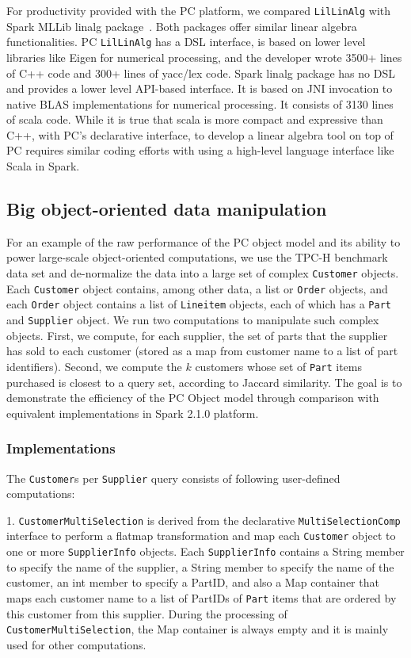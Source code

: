 For productivity provided with the PC platform, we compared
\texttt{LilLinAlg} with Spark MLLib linalg
package~\cite{bosagh2016matrix}. Both packages offer similar linear algebra
functionalities. PC \texttt{LilLinAlg} has a DSL interface, is based on lower level
libraries like Eigen for numerical processing, and the developer 
wrote 3500+
lines of C++ code and 300+ lines of yacc/lex code. Spark linalg
package has no DSL and provides a lower level API-based interface. It
is based on JNI invocation to native BLAS implementations for
numerical processing. It consists of 3130 lines of scala
code. While it is true that scala is more compact and expressive
than C++, with PC's declarative interface, to develop a linear algebra
tool on top of PC requires similar coding efforts with using a
high-level language interface like Scala in Spark.



\subsection{Big object-oriented data manipulation}
For an example of the raw performance of the PC object model and its ability to power large-scale 
object-oriented computations, we use the TPC-H benchmark data set \cite{council2008tpc}
and de-normalize
the data into a large set of complex \texttt{Customer} objects. Each
\texttt{Customer} object contains, among
other data, a list
or \texttt{Order} objects, and each \texttt{Order} object contains a list of \texttt{Lineitem} objects,
each of which has a \texttt{Part} and \texttt{Supplier} object.  
We run two computations to manipulate such complex objects. First, we compute, for each supplier,
the set of parts that the supplier has sold to each customer (stored
as a map from customer name to a list of part identifiers).
Second, we compute the $k$ customers whose set of \texttt{Part} items purchased is closest to
a query set, according to Jaccard similarity.
The goal is to demonstrate the efficiency of the PC
Object model through comparison with equivalent implementations in Spark 2.1.0 platform.

\subsubsection{Implementations}
The \texttt{Customer}s per \texttt{Supplier} query consists of
following user-defined computations:  

\vspace{5pt}
1. \texttt{CustomerMultiSelection} is derived from the
declarative \texttt{MultiSelectionComp} interface to perform a flatmap
transformation and map each \texttt{Customer} object to one or more
\texttt{SupplierInfo} objects. Each \texttt{SupplierInfo} contains a
String member to specify the name of the supplier, a String member to
specify the name of the customer, an int member to specify a PartID, and
also a Map container that maps each customer name to a list of PartIDs
of \texttt{Part} items that are
ordered by this customer from this supplier. During the processing of
\texttt{CustomerMultiSelection}, the Map container is always empty and
it is mainly used for other computations.

